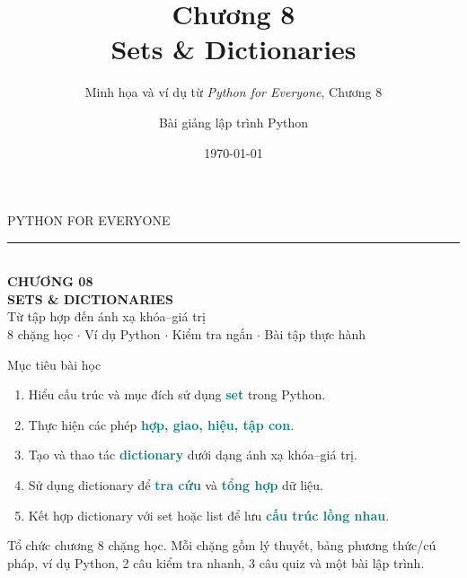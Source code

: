 \documentclass[aspectratio=169,10pt]{beamer}
\title[Chương 8: Sets \& Dictionaries]{Chương 8\\Sets \& Dictionaries}
\subtitle{Minh họa và ví dụ từ \textit{Python for Everyone}, Chương 8}
\author{Bài giảng lập trình Python}
\institute{Tài liệu học tập / Python for Everyone}
\date{\today}
\newcommand{\term}[1]{\textcolor{teal}{\textbf{#1}}}
\begin{document}
\begin{frame}[plain]
\vspace{1.05cm}
{\color{white}\Large PYTHON FOR EVERYONE \hspace{.2em}\rule{3cm}{.5pt}}\\[.6cm]
{\color{white}\fontsize{28}{33}\selectfont\bfseries CHƯƠNG 08}\\[.23cm]
{\color{white}\fontsize{27}{31}\selectfont\bfseries SETS \& DICTIONARIES}\\[.45cm]
{\color{white!88}\large Từ tập hợp đến ánh xạ khóa--giá trị}\\[.8cm]
{\color{white!75}\small 8 chặng học \quad $\cdot$ \quad Ví dụ Python \quad $\cdot$ \quad Kiểm tra ngắn \quad $\cdot$ \quad Bài tập thực hành}
\end{frame}

\begin{frame}[t]{Mục tiêu bài học}

\begin{enumerate}
 \item Hiểu cấu trúc và mục đích sử dụng \term{set} trong Python.
 \item Thực hiện các phép \term{hợp, giao, hiệu, tập con}.
 \item Tạo và thao tác \term{dictionary} dưới dạng ánh xạ khóa--giá trị.
 \item Sử dụng dictionary để \term{tra cứu} và \term{tổng hợp} dữ liệu.
 \item Kết hợp dictionary với set hoặc list để lưu \term{cấu trúc lồng nhau}.
\end{enumerate}
\begin{block}{Tổ chức chương}
8 chặng học. Mỗi chặng gồm lý thuyết, bảng phương thức/cú pháp, ví dụ Python, 2 câu kiểm tra nhanh, 3 câu quiz và một bài lập trình.
\end{block}

\end{frame}
\end{document}
